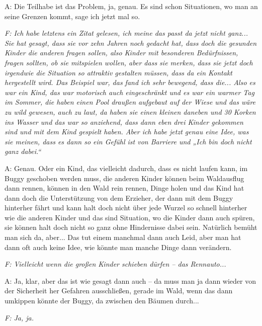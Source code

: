 A: Die Teilhabe ist das Problem, ja, genau. Es sind schon Situationen, wo man an seine Grenzen kommt, sage ich jetzt mal so.

\emph{F: Ich habe letztens ein Zitat gelesen, ich meine das passt da jetzt nicht ganz... Sie hat gesagt, dass sie vor zehn Jahren noch gedacht hat, dass doch die gesunden Kinder die anderen fragen sollen, also Kinder mit besonderen Bedürfnissen, fragen sollten, ob sie mitspielen wollen, aber dass sie merken, dass sie jetzt doch irgendwie die Situation so attraktiv gestalten müssen, dass da ein Kontakt hergestellt wird. Das Beispiel war, das fand ich sehr bewegend, dass die... Also es war ein Kind, das war motorisch auch eingeschränkt und es war ein warmer Tag im Sommer, die haben einen Pool draußen aufgebaut auf der Wiese und das wäre zu wild gewesen, auch zu laut, da haben sie einen kleinen daneben und 30 Korken ins Wasser und das war so anziehend, dass dann eben drei Kinder gekommen sind und mit dem Kind gespielt haben. Aber ich habe jetzt genau eine Idee, was sie meinen, dass es dann so ein Gefühl ist von Barriere und „Ich bin doch nicht ganz dabei.“} 

A: Genau. Oder ein Kind, das vielleicht dadurch, dass es nicht laufen kann, im Buggy geschoben werden muss, die anderen Kinder können beim Waldausflug dann rennen, können in den Wald rein rennen, Dinge holen und das Kind hat dann doch die Unterstützung von dem Erzieher, der dann mit dem Buggy hinterher fährt und kann halt doch nicht über jede Wurzel so schnell hinterher wie die anderen Kinder und das sind Situation, wo die Kinder dann auch spüren, sie können halt doch nicht so ganz ohne Hindernisse dabei sein. Natürlich bemüht man sich da, aber... Das tut einem manchmal dann auch Leid, aber man hat dann oft auch keine Idee, wie könnte man manche Dinge dann verändern.

\emph{F: Vielleicht wenn die großen Kinder schieben dürfen -- das Rennauto...}

A: Ja, klar, aber das ist wie gesagt dann auch -- da muss man ja dann wieder von der Sicherheit her Gefahren ausschließen, gerade im Wald, wenn das dann umkippen könnte der Buggy, da zwischen den Bäumen durch...

\emph{F: Ja, ja.}

